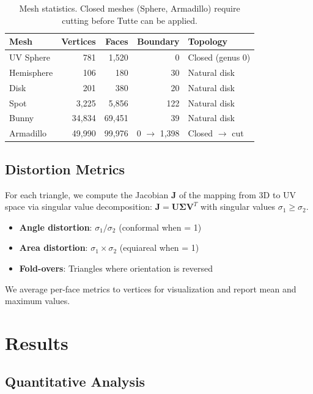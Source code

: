 \documentclass[11pt]{article}
\begin{document}
\begin{table}[H]
\centering
\begin{tabular}{lrrrl}
\toprule
\textbf{Mesh} & \textbf{Vertices} & \textbf{Faces} & \textbf{Boundary} & \textbf{Topology} \\
\midrule
UV Sphere & 781 & 1,520 & 0 & Closed (genus 0) \\
Hemisphere & 106 & 180 & 30 & Natural disk \\
Disk & 201 & 380 & 20 & Natural disk \\
Spot & 3,225 & 5,856 & 122 & Natural disk \\
Bunny & 34,834 & 69,451 & 39 & Natural disk \\
Armadillo & 49,990 & 99,976 & 0 $\rightarrow$ 1,398 & Closed $\rightarrow$ cut \\
\bottomrule
\end{tabular}
\caption{Mesh statistics. Closed meshes (Sphere, Armadillo) require cutting before Tutte can be applied.}
\end{table}

\subsection{Distortion Metrics}

For each triangle, we compute the Jacobian $\mathbf{J}$ of the mapping from 3D to UV space via singular value decomposition: $\mathbf{J} = \mathbf{U}\mathbf{\Sigma}\mathbf{V}^T$ with singular values $\sigma_1 \geq \sigma_2$.

\begin{itemize}
    \item \textbf{Angle distortion}: $\sigma_1/\sigma_2$ (conformal when = 1)
    \item \textbf{Area distortion}: $\sigma_1 \times \sigma_2$ (equiareal when = 1)
    \item \textbf{Fold-overs}: Triangles where orientation is reversed
\end{itemize}

We average per-face metrics to vertices for visualization and report mean and maximum values.

\section{Results}

\subsection{Quantitative Analysis}
\end{document}

